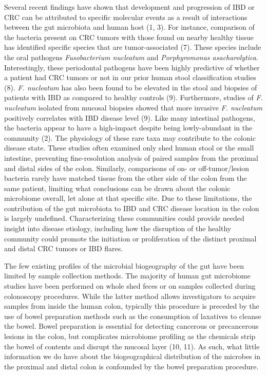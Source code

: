 \documentclass[11pt,]{article}
\begin{document}
Several recent findings have shown that development and progression of
IBD or CRC can be attributed to specific molecular events as a result of
interactions between the gut microbiota and human host (1, 3). For
instance, comparison of the bacteria present on CRC tumors with those
found on nearby healthy tissue has identified specific species that are
tumor-associated (7). These species include the oral pathogens
\emph{Fusobacterium nucleatum} and \emph{Porphyromonas asacharolytica}.
Interestingly, these periodontal pathogens have been highly predictive
of whether a patient had CRC tumors or not in our prior human stool
classification studies (8). \emph{F. nucleatum} has also been found to
be elevated in the stool and biopsies of patients with IBD as compared
to healthy controls (9). Furthermore, studies of \emph{F. nucleatum}
isolated from mucosal biopsies showed that more invasive \emph{F.
nucleatum} positively correlates with IBD disease level (9). Like many
intestinal pathogens, the bacteria appear to have a high-impact despite
being lowly-abundant in the community (2). The physiology of these rare
taxa may contribute to the colonic disease state. These studies often
examined only shed human stool or the small intestine, preventing
fine-resolution analysis of paired samples from the proximal and distal
sides of the colon. Similarly, comparisons of on- or off-tumor/lesion
bacteria rarely have matched tissue from the other side of the colon
from the same patient, limiting what conclusions can be drawn about the
colonic microbiome overall, let alone at that specific site. Due to
these limitations, the contribution of the gut microbiota to IBD and CRC
disease location in the colon is largely undefined. Characterizing these
communities could provide needed insight into disease etiology,
including how the disruption of the healthy community could promote the
initiation or proliferation of the distinct proximal and distal CRC
tumors or IBD flares.

The few existing profiles of the microbial biogeography of the gut have
been limited by sample collection methods. The majority of human gut
microbiome studies have been performed on whole shed feces or on samples
collected during colonoscopy procedures. While the latter method allows
investigators to acquire samples from inside the human colon, typically
this procedure is preceded by the use of bowel preparation methods such
as the consumption of laxatives to cleanse the bowel. Bowel preparation
is essential for detecting cancerous or precancerous lesions in the
colon, but complicates microbiome profiling as the chemicals strip the
bowel of contents and disrupt the mucosal layer (10, 11). As such, what
little information we do have about the biogeographical distribution of
the microbes in the proximal and distal colon is confounded by the bowel
preparation procedure.
\end{document}

